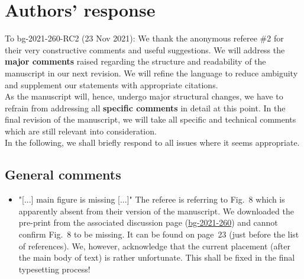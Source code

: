 \documentclass{scrartcl}
\begin{document}
\section*{Authors' response}
To bg-2021-260-RC2 (23 Nov 2021):
We thank the anonymous referee \#2 for their very constructive comments and useful suggestions.
We will address the \textbf{major comments} raised regarding the structure and readability of the manuscript in our next revision. We will refine the language to reduce ambiguity and supplement our statements with appropriate citations.\\
As the manuscript will, hence, undergo major structural changes, we have to refrain from addressing all \textbf{specific comments} in detail at this point. In the final revision of the manuscript, we will take all specific and technical comments which are still relevant into consideration.\\
In the following, we shall briefly respond to all issues where it seems appropriate.
\subsection*{General comments}
\begin{itemize}
    
    \item {\color{blue} "[...] main figure is missing [...]"} The referee is referring to Fig.~8 which is apparently absent from their version of the manuscript. We downloaded the pre-print from the associated discussion page (\href{https://bg.copernicus.org/preprints/bg-2021-260/}{bg-2021-260}) and cannot confirm Fig.~8 to be missing. It can be found on page~23 (just before the list of references). We, however, acknowledge that the current placement (after the main body of text) is rather unfortunate. This shall be fixed in the final typesetting process!

\end{itemize}
\end{document}

